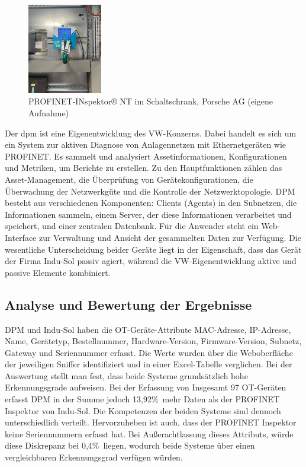\begin{figure}[H]
    \centering
    \includegraphics[width=0.29\textwidth]{images/PROFINET-INspektor.jpg}
    \caption{PROFINET-INspektor® NT im Schaltschrank, Porsche AG (eigene Aufnahme)}
    \label{fig:PROFINET-INspektor® NT}
\end{figure} 
Der \ac{dpm} ist eine Eigenentwicklung des VW-Konzerns. Dabei handelt es sich um ein System zur aktiven Diagnose von Anlagennetzen mit Ethernetgeräten wie PROFINET. Es sammelt und analysiert Assetinformationen, Konfigurationen und Metriken, um Berichte zu erstellen. 
Zu den Hauptfunktionen zählen das Asset-Management, die Überprüfung von Gerätekonfigurationen, die Überwachung der Netzwerkgüte und die Kontrolle der Netzwerktopologie. DPM besteht aus verschiedenen Komponenten: Clients (Agents) in den Subnetzen, die Informationen sammeln, einem Server, der diese Informationen verarbeitet und speichert, und einer zentralen Datenbank. Für die Anwender steht ein Web-Interface zur Verwaltung und Ansicht der gesammelten Daten zur Verfügung. Die wesentliche Unterscheidung beider Geräte liegt in der Eigenschaft, dass das Gerät der Firma Indu-Sol passiv agiert, während die VW-Eigenentwicklung aktive und passive Elemente kombiniert. 

\subsection{Analyse und Bewertung der Ergebnisse}

DPM und Indu-Sol haben die OT-Geräte-Attribute MAC-Adresse, IP-Adresse, Name, Gerätetyp, Bestellnummer, Hardware-Version, Firmware-Version, Subnetz, Gateway und Seriennummer erfasst. Die Werte wurden über die Weboberfläche der jeweiligen Sniffer identifiziert und in einer Excel-Tabelle verglichen. Bei der Auswertung stellt man fest, dass beide Systeme grundsätzlich hohe Erkennungsgrade aufweisen.  Bei der Erfassung von Insgesamt 97 OT-Geräten erfasst DPM in der Summe jedoch 13,92\%\ mehr Daten als der PROFINET Inspektor von Indu-Sol. 
Die Kompetenzen der beiden Systeme sind dennoch unterschiedlich verteilt. Hervorzuheben ist auch, dass der PROFINET Inspektor keine Seriennummern erfasst hat. Bei Außerachtlassung dieses Attributs, würde diese Diskrepanz bei 0,4\%\ liegen, wodurch beide Systeme über einen vergleichbaren Erkennungsgrad verfügen würden.  


